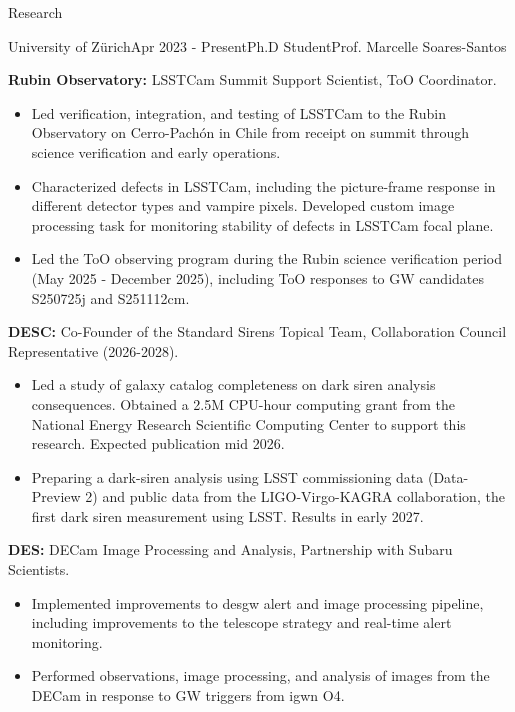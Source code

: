 \documentclass{resume} %
\begin{document}
\begin{rSection}{Research}

\begin{rSubsection}{University of Zürich}{Apr 2023 - Present}{Ph.D Student}{Prof. Marcelle Soares-Santos}

    \item \textbf{Rubin Observatory:} \ac{LSSTCam} Summit Support Scientist, \ac{ToO} Coordinator.
    \begin{itemize}
        \item Led verification, integration, and testing of \ac{LSSTCam} to the Rubin Observatory on Cerro-Pachón in Chile from receipt on summit through science verification and early operations.
        \item Characterized defects in \ac{LSSTCam}, including the picture-frame response in different detector types and vampire pixels. Developed custom image processing task for monitoring stability of defects in \ac{LSSTCam} focal plane.
        \item Led the \ac{ToO} observing program during the Rubin science verification period (May 2025 - December 2025), including \ac{ToO} responses to \ac{GW} candidates S250725j and S251112cm.
    \end{itemize}
    \item \textbf{\ac{DESC}:} Co-Founder of the Standard Sirens Topical Team, Collaboration Council Representative (2026-2028).
    \begin{itemize}
        \item Led a study of galaxy catalog completeness on dark siren analysis consequences. Obtained a 2.5M CPU-hour computing grant from the National Energy Research Scientific Computing Center to support this research. Expected publication mid 2026.
        \item Preparing a dark-siren analysis using LSST commissioning data (Data-Preview 2) and public data from the LIGO-Virgo-KAGRA collaboration, the first dark siren measurement using LSST. Results in early 2027.
    \end{itemize}
     \item \textbf{\ac{DES}:} \ac{DECam} Image Processing and Analysis, Partnership with Subaru Scientists.
     \begin{itemize}
         \item Implemented improvements to \ac{desgw} alert and image processing pipeline, including improvements to the telescope strategy and real-time alert monitoring.
         \item Performed observations, image processing, and analysis of images from the \ac{DECam} in response to \ac{GW} triggers from \ac{igwn} \ac{O4}. 

\end{itemize}
\end{rSubsection}
\end{rSection}
\end{document}
